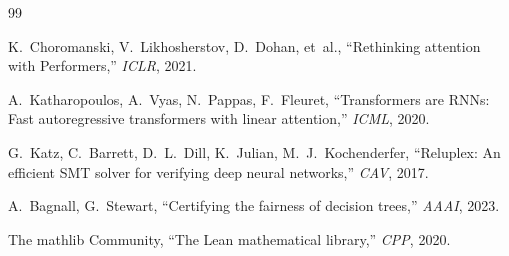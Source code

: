 \documentclass[11pt,a4paper,twocolumn]{article}
\theoremstyle{definition}
\theoremstyle{remark}
\begin{document}
\begin{thebibliography}{99}

K.~Choromanski, V.~Likhosherstov, D.~Dohan, et~al.,
``Rethinking attention with Performers,''
\textit{ICLR}, 2021.

A.~Katharopoulos, A.~Vyas, N.~Pappas, F.~Fleuret,
``Transformers are RNNs: Fast autoregressive transformers with linear
attention,''
\textit{ICML}, 2020.

G.~Katz, C.~Barrett, D.~L.~Dill, K.~Julian, M.~J.~Kochenderfer,
``Reluplex: An efficient SMT solver for verifying deep neural networks,''
\textit{CAV}, 2017.

A.~Bagnall, G.~Stewart,
``Certifying the fairness of decision trees,''
\textit{AAAI}, 2023.

The mathlib Community,
``The Lean mathematical library,''
\textit{CPP}, 2020.

\end{thebibliography}
\end{document}
